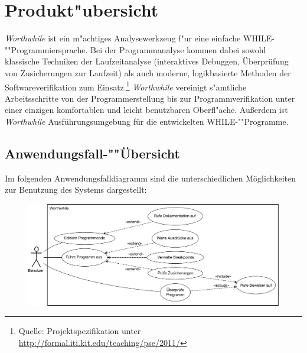 \section{Produkt"ubersicht}%

\textit{Worthwhile} ist ein m"achtiges Analysewerkzeug f"ur eine einfache WHILE-""Programmiersprache. Bei der Programmanalyse kommen dabei sowohl klassische Techniken der Laufzeitanalyse (interaktives Debuggen, Überprüfung von Zusicherungen zur Laufzeit) als auch moderne, logikbasierte Methoden der Softwareverifikation zum Einsatz.\footnote{Quelle: Projektspezifikation unter \url{http://formal.iti.kit.edu/teaching/pse/2011/}} \textit{Worthwhile} vereinigt s"amtliche Arbeitsschritte von der Programmerstellung bis zur Programmverifikation unter einer einzigen komfortablen und leicht benutzbaren Oberfl"ache. Außerdem ist \textit{Worthwhile} Ausführungsumgebung für die entwickelten WHILE-""Programme.%

\subsection{Anwendungsfall-""Übersicht}

Im folgenden Anwendungsfalldiagramm sind die unterschiedlichen Möglichkeiten zur Benutzung des Systems dargestellt:

\begin{figure}[H]
	\includegraphics[width=\textwidth]{usecase/usecase.pdf}
\end{figure}
